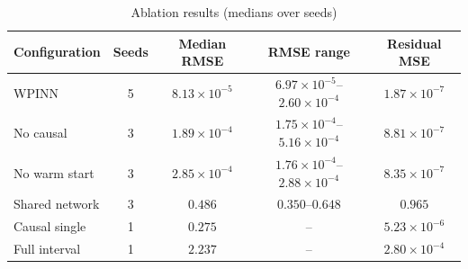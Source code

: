 \begin{table}[t]
\caption{Ablation results (medians over seeds)}
\label{tab:ablations}
\centering\footnotesize
\begin{tabular}{lcccc}
\toprule
Configuration & Seeds & Median RMSE & RMSE range & Residual MSE\\
\midrule
WPINN & 5 & $8.13\!\times\!10^{-5}$ & $6.97\!\times\!10^{-5}$--$2.60\!\times\!10^{-4}$ & $1.87\!\times\!10^{-7}$\\
No causal & 3 & $1.89\!\times\!10^{-4}$ & $1.75\!\times\!10^{-4}$--$5.16\!\times\!10^{-4}$ & $8.81\!\times\!10^{-7}$\\
No warm start & 3 & $2.85\!\times\!10^{-4}$ & $1.76\!\times\!10^{-4}$--$2.88\!\times\!10^{-4}$ & $8.35\!\times\!10^{-7}$\\
Shared network & 3 & $0.486$ & $0.350$--$0.648$ & $0.965$\\
Causal single & 1 & $0.275$ & -- & $5.23\!\times\!10^{-6}$\\
Full interval & 1 & $2.237$ & -- & $2.80\!\times\!10^{-4}$\\
\bottomrule
\end{tabular}
\end{table}
